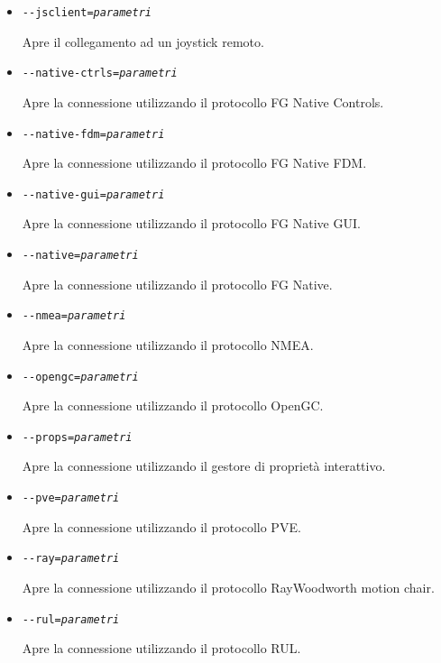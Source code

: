 {\begin{itemize}
  \item{\texttt{-$ $-jsclient={\it parametri}}}

    Apre il collegamento ad un joystick remoto.

  \item{\texttt{-$ $-native-ctrls={\it parametri}}}

    Apre la connessione utilizzando il protocollo FG Native Controls.

  \item{\texttt{-$ $-native-fdm={\it parametri}}}

    Apre la connessione utilizzando il protocollo FG Native FDM.

  \item{\texttt{-$ $-native-gui={\it parametri}}}

    Apre la connessione utilizzando il protocollo FG Native GUI.

  \item{\texttt{-$ $-native={\it parametri}}}

    Apre la connessione utilizzando il protocollo FG Native.

  \item{\texttt{-$ $-nmea={\it parametri}}}

    Apre la connessione utilizzando il protocollo NMEA.

  \item{\texttt{-$ $-opengc={\it parametri}}}

    Apre la connessione utilizzando il protocollo OpenGC.

  \item{\texttt{-$ $-props={\it parametri}}}

    Apre la connessione utilizzando il gestore di propriet\`{a} interattivo.

  \item{\texttt{-$ $-pve={\it parametri}}}

    Apre la connessione utilizzando il protocollo PVE.

  \item{\texttt{-$ $-ray={\it parametri}}}

    Apre la connessione utilizzando il protocollo RayWoodworth motion chair.

  \item{\texttt{-$ $-rul={\it parametri}}}

    Apre la connessione utilizzando il protocollo RUL.

  \end{itemize}
}
\ifchinese
